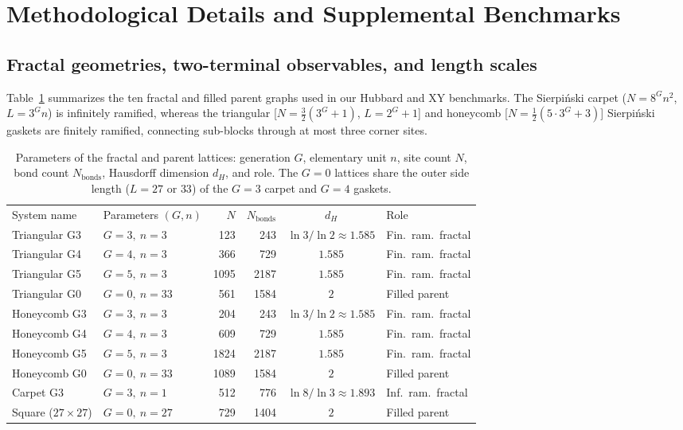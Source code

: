 \documentclass[aps,prb,twocolumn,superscriptaddress,floatfix]{revtex4-2}
\begin{document}
\section{Methodological Details and Supplemental Benchmarks}
\label{app:benchmark}

\subsection{Fractal geometries, two-terminal observables, and length scales}

Table~\ref{tab:lattices} summarizes the ten fractal and filled parent graphs used in our Hubbard and XY benchmarks. The Sierpi\'nski carpet ($N = 8^G n^2$, $L = 3^G n$) is infinitely ramified, whereas the triangular [$N = \frac{3}{2}(3^G + 1)$, $L = 2^G + 1$] and honeycomb [$N = \frac{1}{2}(5\cdot 3^G + 3)$] Sierpi\'nski gaskets are finitely ramified, connecting sub-blocks through at most three corner sites.

\begin{table}[t]
\caption{Parameters of the fractal and parent lattices: generation $G$, elementary unit $n$, site count $N$, bond count $N_{\mathrm{bonds}}$, Hausdorff dimension $d_H$, and role. The $G=0$ lattices share the outer side length ($L = 27$ or $33$) of the $G=3$ carpet and $G=4$ gaskets.}
\label{tab:lattices}
\begin{ruledtabular}
\begin{tabular}{llrrcl}
System name & Parameters $(G, n)$ & $N$ & $N_{\mathrm{bonds}}$ & $d_H$ & Role \\
\colrule
Triangular G3 & $G=3,\ n=3$ & 123 & 243 & $\ln 3/\ln 2 \approx 1.585$ & Fin.\ ram.\ fractal \\
Triangular G4 & $G=4,\ n=3$ & 366 & 729 & $1.585$ & Fin.\ ram.\ fractal \\
Triangular G5 & $G=5,\ n=3$ & 1095 & 2187 & $1.585$ & Fin.\ ram.\ fractal \\
Triangular G0 & $G=0,\ n=33$ & 561 & 1584 & $2$ & Filled parent \\
\colrule
Honeycomb G3 & $G=3,\ n=3$ & 204 & 243 & $\ln 3/\ln 2 \approx 1.585$ & Fin.\ ram.\ fractal \\
Honeycomb G4 & $G=4,\ n=3$ & 609 & 729 & $1.585$ & Fin.\ ram.\ fractal \\
Honeycomb G5 & $G=5,\ n=3$ & 1824 & 2187 & $1.585$ & Fin.\ ram.\ fractal \\
Honeycomb G0 & $G=0,\ n=33$ & 1089 & 1584 & $2$ & Filled parent \\
\colrule
Carpet G3 & $G=3,\ n=1$ & 512 & 776 & $\ln 8/\ln 3 \approx 1.893$ & Inf.\ ram.\ fractal \\
Square ($27\times 27$) & $G=0,\ n=27$ & 729 & 1404 & $2$ & Filled parent \\
\end{tabular}
\end{ruledtabular}
\end{table}
\end{document}
